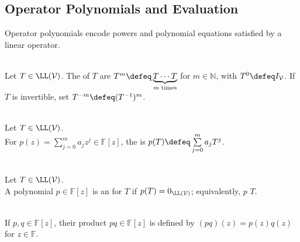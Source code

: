 \subsection{Operator Polynomials and Evaluation}

%

Operator polynomials encode powers and polynomial equations satisfied by a linear operator.

\begin{definition} \label{def:operator-powers} \\
Let $T\in\LL(\mathcal{V})$.
The  of $T$ are $T^m\defeq\underbrace{T\cdots T}_{m\text{ times}}$ for $m\in\mathbb{N}$, with $T^0\defeq I_{\mathcal{V}}$. If $T$ is invertible, set $T^{-m}\defeq(T^{-1})^m$.
\end{definition}

\begin{definition} \label{def:polynomial-applied-to-operator} \\
Let $T\in\LL(\mathcal{V})$.\\
For $p(z)=\sum\limits_{j=0}^{m}a_jz^j\in\mathbb{F}[z]$, the  is $p(T)\defeq\sum\limits_{j=0}^{m}a_jT^j$.
\end{definition}

\begin{definition} \label{def:annihilating-polynomial} \\
Let $T\in\LL(\mathcal{V})$.\\
A polynomial $p\in\mathbb{F}[z]$ is an  for $T$ if $p(T)=0_{\LL(\mathcal{V})}$; equivalently, $p$  $T$.
\end{definition}

\begin{definition} \label{def:product-of-polynomials} \\
If $p,q\in\mathbb{F}[z]$, their product $pq\in\mathbb{F}[z]$ is defined by $(pq)(z)=p(z)q(z)$ for $z\in\mathbb{F}$.
\end{definition}

